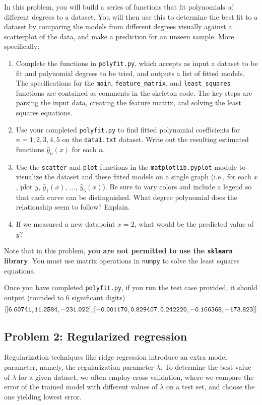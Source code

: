\documentclass[10pt]{article}
\begin{document}
In this problem, you will build a series of functions that fit polynomials of different degrees to a dataset. You will then use this to determine the best fit to a dataset by comparing the models from different degrees visually against a scatterplot of the data, and make a prediction for an unseen sample. More specifically:
\begin{enumerate}
\item Complete the functions in {\tt polyfit.py}, which accepts as input a dataset to be fit and polynomial degrees to be tried, and outputs a list of fitted models. The specifications for the {\tt main}, {\tt feature\_matrix}, and {\tt least\_squares} functions are contained as comments in the skeleton code. The key steps are parsing the input data, creating the feature matrix, and solving the least squares equations.

\item Use your completed {\tt polyfit.py} to find fitted polynomial coefficients for $n = 1, 2, 3, 4, 5$ on the {\tt data1.txt} dataset. Write out the resulting estimated functions $\hat{y}_n(x)$ for each $n$.

\item Use the {\tt scatter} and {\tt plot} functions in the {\tt matplotlib.pyplot} module to visualize the dataset and these fitted models on a single graph (i.e., for each $x$, plot $y$, $\hat{y}_1(x)$, ..., $\hat{y}_5(x)$). Be sure to vary colors and include a legend so that each curve can be distinguished. What degree polynomial does the relationship seem to follow? Explain.

\item If we measured a new datapoint $x = 2$, what would be the predicted value of $y$?
\end{enumerate}
Note that in this problem, \textbf{you are not permitted to use the {\tt sklearn} library}. You must use matrix operations in {\tt numpy} to solve the least squares equations.

Once you have completed {\tt polyfit.py}, if you run the test case provided, it should output (rounded to 6 significant digits)
$${\tt [ [6.60741, 11.2584, -231.022], [ -0.001170, 0.829407, 0.242220, -0.166368, -173.823] ] }$$

\subsection{Problem 2: Regularized regression}
Regularization techniques like ridge regression introduce an extra model parameter, namely, the regularization parameter $\lambda$. To determine the best value of $\lambda$ for a given dataset, we often employ cross validation, where we compare the error of the trained model with different values of $\lambda$ on a test set, and choose the one yielding lowest error.
\end{document}

